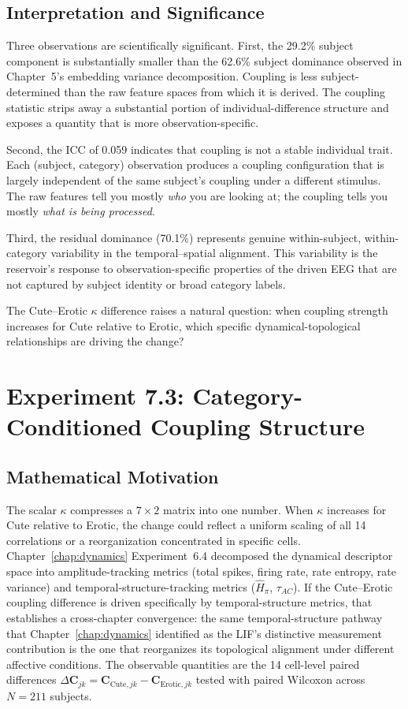 \subsection{Interpretation and Significance}

Three observations are scientifically significant. First, the 29.2\% subject component is substantially smaller than the 62.6\% subject dominance observed in Chapter~5's embedding variance decomposition. Coupling is less subject-determined than the raw feature spaces from which it is derived. The coupling statistic strips away a substantial portion of individual-difference structure and exposes a quantity that is more observation-specific.

Second, the ICC of 0.059 indicates that coupling is not a stable individual trait. Each (subject, category) observation produces a coupling configuration that is largely independent of the same subject's coupling under a different stimulus. The raw features tell you mostly \emph{who} you are looking at; the coupling tells you mostly \emph{what is being processed}.

Third, the residual dominance (70.1\%) represents genuine within-subject, within-category variability in the temporal--spatial alignment. This variability is the reservoir's response to observation-specific properties of the driven EEG that are not captured by subject identity or broad category labels.

The Cute--Erotic $\kappa$ difference raises a natural question: when coupling strength increases for Cute relative to Erotic, which specific dynamical-topological relationships are driving the change?


\section{Experiment 7.3: Category-Conditioned Coupling Structure}
\label{sec:exp7_category}

\subsection{Mathematical Motivation}

The scalar $\kappa$ compresses a $7 \times 2$ matrix into one number. When $\kappa$ increases for Cute relative to Erotic, the change could reflect a uniform scaling of all 14 correlations or a reorganization concentrated in specific cells. Chapter~\ref{chap:dynamics} Experiment~6.4 decomposed the dynamical descriptor space into amplitude-tracking metrics (total spikes, firing rate, rate entropy, rate variance) and temporal-structure-tracking metrics ($\hat{H}_\pi$, $\tau_{AC}$). If the Cute--Erotic coupling difference is driven specifically by temporal-structure metrics, that establishes a cross-chapter convergence: the same temporal-structure pathway that Chapter~\ref{chap:dynamics} identified as the LIF's distinctive measurement contribution is the one that reorganizes its topological alignment under different affective conditions. The observable quantities are the 14 cell-level paired differences $\Delta\mathbf{C}_{jk} = \mathbf{C}_{\text{Cute},jk} - \mathbf{C}_{\text{Erotic},jk}$ tested with paired Wilcoxon across $N = 211$ subjects.

